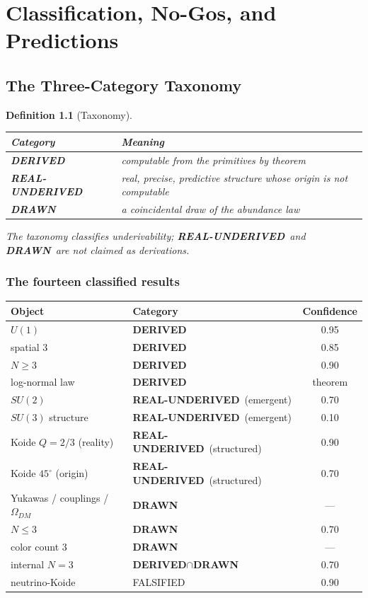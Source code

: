 \documentclass[11pt,twoside]{book}
\newtheorem{definition}[theorem]{Definition}
\newcommand{\derived}{\textbf{DERIVED}}
\newcommand{\realunder}{\textbf{REAL-UNDERIVED}}
\newcommand{\drawn}{\textbf{DRAWN}}
\begin{document}
\part{Classification, No-Gos, and Predictions}

\chapter{The Three-Category Taxonomy}
\label{ch:taxonomy}

\begin{definition}[Taxonomy]
\begin{center}
\begin{tabular}{ll}
\toprule
Category & Meaning \\
\midrule
\derived & computable from the primitives by theorem \\
\realunder & real, precise, predictive structure whose origin is not computable \\
\drawn & a coincidental draw of the abundance law \\
\bottomrule
\end{tabular}
\end{center}
The taxonomy classifies \emph{underivability}; \realunder\ and \drawn\ are \emph{not}
claimed as derivations.
\end{definition}

\section{The fourteen classified results}

\begin{center}
\begin{tabular}{llc}
\toprule
Object & Category & Confidence \\
\midrule
$U(1)$ & \derived & 0.95 \\
spatial 3 & \derived & 0.85 \\
$N\ge3$ & \derived & 0.90 \\
log-normal law & \derived & theorem \\
$SU(2)$ & \realunder\ (emergent) & 0.70 \\
$SU(3)$ structure & \realunder\ (emergent) & 0.10 \\
Koide $Q=2/3$ (reality) & \realunder\ (structured) & 0.90 \\
Koide $45^\circ$ (origin) & \realunder\ (structured) & 0.70 \\
Yukawas / couplings / $\Omega_{DM}$ & \drawn & — \\
$N\le3$ & \drawn & 0.70 \\
color count 3 & \drawn & — \\
internal $N=3$ & \derived$\cap$\drawn & 0.70 \\
neutrino-Koide & FALSIFIED & 0.90 \\
\bottomrule
\end{tabular}
\end{center}
\end{document}
